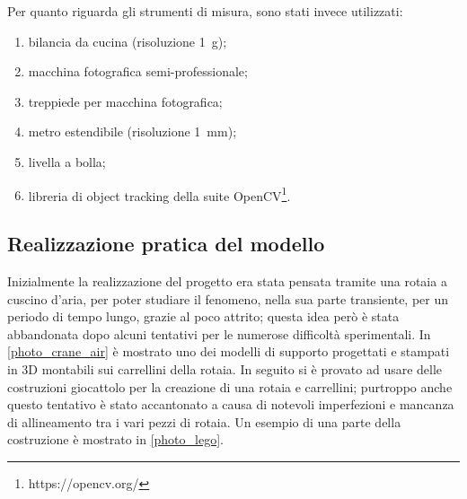 \documentclass[11pt, a4paper, twoside, italian]{article}
\begin{document}
Per quanto riguarda gli strumenti di misura, sono stati invece utilizzati:
\begin{enumerate}
  \item bilancia da cucina (risoluzione \SI{1}{\g});
  \item macchina fotografica semi-professionale;
  \item treppiede per macchina fotografica;
  \item metro estendibile (risoluzione \SI{1}{\milli\m});
  \item livella a bolla;
  \item libreria di object tracking della suite OpenCV\footnote{https://opencv.org/}.
\end{enumerate}
\subsection{Realizzazione pratica del modello}
Inizialmente la realizzazione del progetto era stata pensata tramite 
una rotaia a cuscino d'aria, per poter studiare il fenomeno, nella sua parte transiente, 
per un periodo di tempo lungo, grazie al poco attrito; questa idea però è stata abbandonata dopo alcuni tentativi per
le numerose difficoltà sperimentali. In \cref{photo_crane_air} è mostrato uno dei modelli di supporto
progettati e stampati in 3D montabili sui carrellini della rotaia.
In seguito si è provato ad usare delle costruzioni giocattolo per la creazione di una rotaia
e carrellini; purtroppo anche questo tentativo è stato accantonato a causa di 
notevoli imperfezioni e mancanza di allineamento tra i vari pezzi di rotaia. 
Un esempio di una parte della costruzione è mostrato in \cref{photo_lego}.
\end{document}
